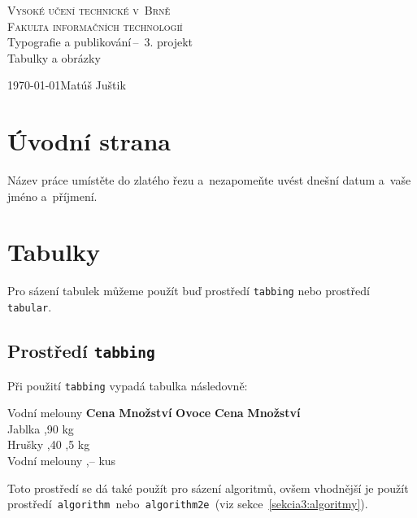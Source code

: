 \documentclass[a4paper, 11pt]{article}
\begin{document}
  
  \begin{titlepage}
    \begin{center} 
    \textsc{\Huge Vysoké učení technické v~Brně\\ \huge Fakulta informačních technologií \\}
    \LARGE Typografie a publikování\,--\ 3. projekt \\ \Huge Tabulky a obrázky
    \end{center}
    \Large \today \hfill Matúš Juštik

  \end{titlepage}

 \section{Úvodní strana}
 
 Název práce umístěte do zlatého řezu a~nezapomeňte uvést dnešní datum a~vaše jméno a~příjmení.
 
 \section{Tabulky}
 
 Pro sázení tabulek můžeme použít buď prostředí \texttt{tabbing} nebo prostředí \texttt{tabular}.
 
 \subsection{Prostředí \texttt{tabbing}}
 
 Při použití \texttt{tabbing} vypadá tabulka následovně:
 
 \begin{tabbing}
     Vodní melouny \quad	\= \textbf{Cena} \quad	\= \textbf{Množství}	\kill
		\textbf{Ovoce}		\>\textbf{Cena}		    \>\textbf{Množství}	    \\
		Jablka				,90				 kg					\\
		Hrušky				,40				,5 kg				\\
		Vodní melouny		,--				 kus				\\
 
 \end{tabbing}
 
 \noindent Toto prostředí se dá také použít pro sázení algoritmů, ovšem vhodnější je použít
 prostředí\texttt{ algorithm }nebo\texttt{ algorithm2e }(viz sekce~\ref{sekcia3:algoritmy}).
	
\end{document}

